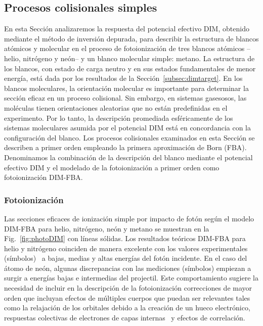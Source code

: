 \subsection{Procesos colisionales simples}

En esta Sección analizaremos la respuesta del potencial efectivo DIM, 
obtenido mediante el método de inversión depurada, para describir la 
estructura de blancos atómicos y molecular en el proceso de 
fotoionización de tres blancos atómicos --helio, nitrógeno y neón-- y un 
blanco molecular simple: metano. La estructura de los blancos, con 
estado de carga neutro y en sus estados fundamentales de menor energía, 
está dada por los resultados de la Sección~\ref{subsec:dimtarget}. 
En los blancos moleculares, la orientación molecular es importante para 
determinar la sección eficaz en un proceso colisional. Sin embargo, en 
sistemas gasesosos, las moléculas tienen orientaciones aleatorias que no 
están predefinidas en el experimento. Por lo tanto, la descripción 
promediada esféricamente de los sistemas moleculares asumida por el 
potencial DIM está en concordancia con la configuración del blanco.
Los procesos colisionales examinados en esta Sección se describen a 
primer orden empleando la primera aproximación de Born (FBA). 
Denominamos la combinación de la descripción del blanco mediante el 
potencial efectivo DIM y el modelado de la fotoionización a primer orden 
como fotoionización DIM-FBA.  

\subsubsection{Fotoionización}
\label{subsec:foto}

Las secciones eficaces de ionización simple por impacto de fotón según 
el modelo DIM-FBA para helio, nitrógeno, neón y metano se muestran en 
la Fig.~\ref{fig:photoDIM} con líneas 
sólidas. Los resultados teóricos DIM-FBA para helio y nitrógeno 
coinciden de manera excelente con los valores experimentales 
(símbolos)~\cite{Samson:90,Henke:93,Stolte:16} a bajas, medias y altas 
energías del fotón incidente. En el caso del átomo de neón, algunas 
discrepancias con las mediciones (símbolos) \cite{Henke:93,Samson:02} 
empiezan a surgir a energías bajas e intermedias del projectil. Este 
comportamiento sugiere la necesidad de incluir en la descripción de la 
fotoionización correcciones de mayor orden que incluyan efectos de 
múltiples cuerpos que puedan ser relevantes tales como la relajación de 
los orbitales debido a la creación de un hueco electrónico, respuestas 
colectivas de electrones de capas internas~\cite{Ederer:64} y efectos de 
correlación.

